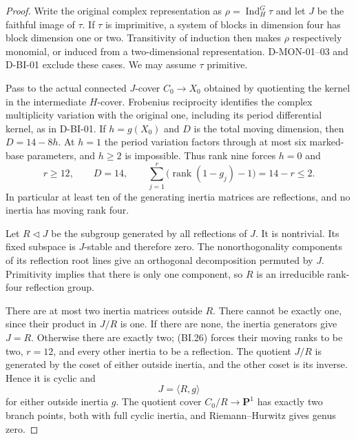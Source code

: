\begin{proof}
Write the original complex representation as
$\rho=\operatorname{Ind}_H^G\tau$ and let $J$ be the faithful
image of $\tau$.  If $\tau$ is imprimitive, a system of blocks in
dimension four has block dimension one or two.  Transitivity of
induction then makes $\rho$ respectively monomial, or induced
from a two-dimensional representation.  D-MON-01--03 and D-BI-01
exclude these cases.  We may assume $\tau$ primitive.

Pass to the actual connected $J$-cover $C_0\to X_0$ obtained by
quotienting the kernel in the intermediate $H$-cover.  Frobenius
reciprocity identifies the complex multiplicity variation with
the original one, including its period differential kernel, as
in D-BI-01.  If $h=g(X_0)$ and $D$ is the total moving dimension,
then $D=14-8h$.  At $h=1$ the period variation factors through
at most six marked-base parameters, and $h\ge2$ is impossible.
Thus rank nine forces $h=0$ and
\[
 r\ge12,\qquad D=14,\qquad
 \sum_{j=1}^r\bigl(\operatorname{rank}(1-g_j)-1\bigr)=14-r\le2.
                                                               \tag{BI.26}
\]
In particular at least ten of the generating inertia matrices are
reflections, and no inertia has moving rank four.

Let $R\lhd J$ be the subgroup generated by all reflections of
$J$.  It is nontrivial.  Its fixed subspace is $J$-stable and
therefore zero.  The nonorthogonality components of its reflection
root lines give an orthogonal decomposition permuted by $J$.
Primitivity implies that there is only one component, so $R$ is
an irreducible rank-four reflection group.

There are at most two inertia matrices outside $R$.  There cannot
be exactly one, since their product in $J/R$ is one.  If there are
none, the inertia generators give $J=R$.  Otherwise there are
exactly two; (BI.26) forces their moving ranks to be two, $r=12$,
and every other inertia to be a reflection.  The quotient $J/R$
is generated by the coset of either outside inertia, and the other
coset is its inverse.  Hence it is cyclic and
\[
                         J=\langle R,g\rangle               \tag{BI.27}
\]
for either outside inertia $g$.  The quotient cover
$C_0/R\to\mathbf P^1$ has exactly two branch points, both with
full cyclic inertia, and Riemann--Hurwitz gives genus zero.


\end{proof}
